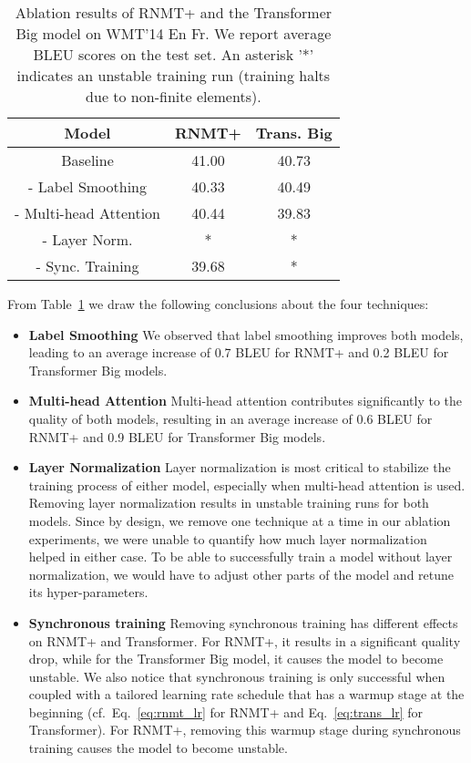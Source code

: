 \documentclass[11pt,a4paper]{article}
\begin{document}
\begin{table}[!htbp]
\centering
\begin{tabular}{c|c|c}
 \hline
 \hline
 Model & RNMT+ & Trans. Big \\
 \hline
Baseline & 41.00 & 40.73\\
- Label Smoothing & 40.33 & 40.49\\
- Multi-head Attention & 40.44 & 39.83\\
- Layer Norm. & * & *\\
- Sync. Training & 39.68 & *\\
 \hline
\end{tabular}
\caption{Ablation results of RNMT+ and the Transformer Big model on WMT'14
En  Fr. We report average BLEU
scores on the test set. An asterisk '\mbox{*}' indicates an unstable training run
(training halts due to non-finite elements).}
\label{table:enfr_ablation}
\end{table}

From Table~\ref{table:enfr_ablation} we draw the following conclusions about the
four techniques:
\begin{itemize}
\item \textbf{Label Smoothing}
We observed that label smoothing improves both models, leading to an
average increase of 0.7 BLEU for RNMT+ and 0.2 BLEU for Transformer Big models.
\item \textbf{Multi-head Attention}
Multi-head attention contributes significantly to the quality of
both models, resulting in an average increase of 0.6 BLEU for RNMT+ and 0.9 BLEU
for Transformer Big models.
\item \textbf{Layer Normalization}
Layer normalization is most critical to stabilize the
training process of either model, especially when multi-head attention is used.
Removing layer normalization results in unstable training runs for both models.
Since by design, we remove one technique at a time in our ablation experiments,
we were unable to quantify how much layer
normalization helped in either case. To be able to successfully train a model
without layer normalization, we would have to adjust other parts of the model
and retune its hyper-parameters.
\item \textbf{Synchronous training}
Removing synchronous training has different effects on RNMT+ and Transformer.
For RNMT+, it results in a significant quality drop, while for the
Transformer Big model, it causes the model to become unstable. We also
notice that synchronous training is only successful when coupled
with a tailored learning rate schedule that has a warmup stage at
the beginning (cf.~Eq.~\ref{eq:rnmt_lr} for RNMT+ and
Eq.~\ref{eq:trans_lr} for Transformer). For RNMT+, removing this
warmup stage during synchronous training causes the model to become
unstable.
\end{itemize}
\end{document}
